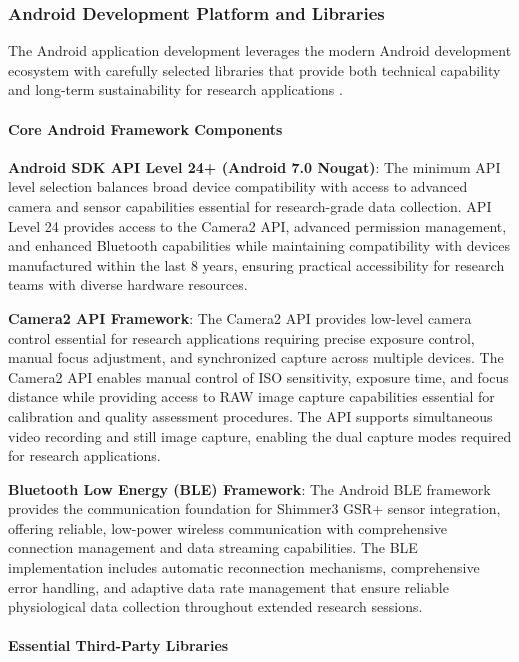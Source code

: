 \documentclass[12pt,a4paper]{report}
\begin{document}
\subsubsection{Android Development Platform and Libraries}

The Android application development leverages the modern Android development ecosystem with carefully selected libraries
that provide both technical capability and long-term sustainability for research applications .

\paragraph{Core Android Framework Components}

\textbf{Android SDK API Level 24+ (Android 7.0 Nougat)}: The minimum API level selection balances broad device compatibility
with access to advanced camera and sensor capabilities essential for research-grade data collection. API Level 24
provides access to the Camera2 API, advanced permission management, and enhanced Bluetooth capabilities while
maintaining compatibility with devices manufactured within the last 8 years, ensuring practical accessibility for
research teams with diverse hardware resources.

\textbf{Camera2 API Framework}: The Camera2 API provides low-level camera control essential for research applications
requiring precise exposure control, manual focus adjustment, and synchronized capture across multiple devices. The
Camera2 API enables manual control of ISO sensitivity, exposure time, and focus distance while providing access to RAW
image capture capabilities essential for calibration and quality assessment procedures. The API supports simultaneous
video recording and still image capture, enabling the dual capture modes required for research applications.

\textbf{Bluetooth Low Energy (BLE) Framework}: The Android BLE framework provides the communication foundation for Shimmer3
GSR+ sensor integration, offering reliable, low-power wireless communication with comprehensive connection management
and data streaming capabilities. The BLE implementation includes automatic reconnection mechanisms, comprehensive error
handling, and adaptive data rate management that ensure reliable physiological data collection throughout extended
research sessions.

\paragraph{Essential Third-Party Libraries}
\end{document}
